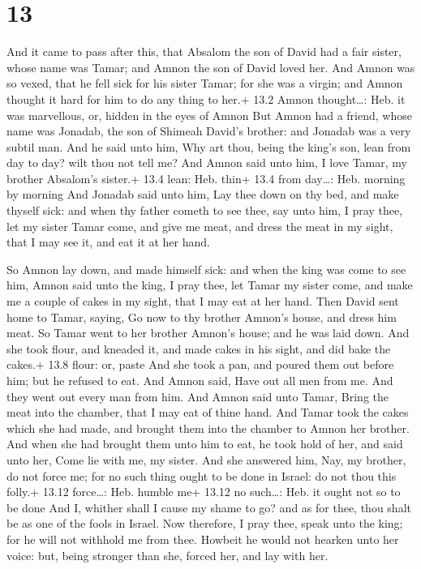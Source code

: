 \hypertarget{section-12}{%
\section{13}\label{section-12}}

 And it came to pass after this, that Absalom the son of
David had a fair sister, whose name was Tamar; and Amnon the son of
David loved her.  And Amnon was so vexed, that he fell sick
for his sister Tamar; for she was a virgin; and Amnon thought it hard
for him to do any thing to her.+ 13.2 Amnon thought\ldots: Heb. it was
marvellous, or, hidden in the eyes of Amnon  But Amnon had a
friend, whose name was Jonadab, the son of Shimeah David's brother: and
Jonadab was a very subtil man.  And he said unto him, Why
art thou, being the king's son, lean from day to day? wilt thou not tell
me? And Amnon said unto him, I love Tamar, my brother Absalom's sister.+
13.4 lean: Heb. thin+ 13.4 from day\ldots: Heb. morning by morning
 And Jonadab said unto him, Lay thee down on thy bed, and
make thyself sick: and when thy father cometh to see thee, say unto him,
I pray thee, let my sister Tamar come, and give me meat, and dress the
meat in my sight, that I may see it, and eat it at her hand.

 So Amnon lay down, and made himself sick: and when the
king was come to see him, Amnon said unto the king, I pray thee, let
Tamar my sister come, and make me a couple of cakes in my sight, that I
may eat at her hand.  Then David sent home to Tamar, saying,
Go now to thy brother Amnon's house, and dress him meat.  So
Tamar went to her brother Amnon's house; and he was laid down. And she
took flour, and kneaded it, and made cakes in his sight, and did bake
the cakes.+ 13.8 flour: or, paste  And she took a pan, and
poured them out before him; but he refused to eat. And Amnon said, Have
out all men from me. And they went out every man from him. 
And Amnon said unto Tamar, Bring the meat into the chamber, that I may
eat of thine hand. And Tamar took the cakes which she had made, and
brought them into the chamber to Amnon her brother.  And
when she had brought them unto him to eat, he took hold of her, and said
unto her, Come lie with me, my sister.  And she answered
him, Nay, my brother, do not force me; for no such thing ought to be
done in Israel: do not thou this folly.+ 13.12 force\ldots: Heb. humble
me+ 13.12 no such\ldots: Heb. it ought not so to be done 
And I, whither shall I cause my shame to go? and as for thee, thou shalt
be as one of the fools in Israel. Now therefore, I pray thee, speak unto
the king; for he will not withhold me from thee.  Howbeit
he would not hearken unto her voice: but, being stronger than she,
forced her, and lay with her.

